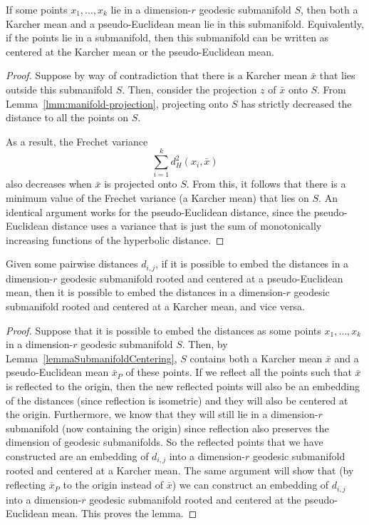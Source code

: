 \begin{lemma}
If some points $x_1, \ldots, x_k$ lie in a dimension-$r$ geodesic submanifold $S$, then both a Karcher mean and a pseudo-Euclidean mean lie in this submanifold.
Equivalently, if the points lie in a submanifold, then this submanifold can be written as centered at the Karcher mean or the pseudo-Euclidean mean. 
\label{lemmaSubmanifoldCentering}
\end{lemma}
\begin{proof}
Suppose by way of contradiction that there is a Karcher mean $\bar x$ that lies outside this submanifold $S$.
Then, consider the projection $z$ of $\bar x$ onto $S$.
From Lemma~\ref{lmm:manifold-projection}, projecting onto $S$ has strictly decreased the distance to all the points on $S$.

As a result, the Frechet variance
\[
  \sum_{i=1}^k d_H^2(x_i, \bar x)
\]
also decreases when $\bar x$ is projected onto $S$.
From this, it follows that there is a minimum value of the Frechet variance (a Karcher mean) that lies on $S$.
An identical argument works for the pseudo-Euclidean distance, since the pseudo-Euclidean distance uses a variance that is just the sum of monotonically increasing functions of the hyperbolic distance.
\end{proof}

\begin{lemma}
Given some pairwise distances $d_{i,j}$, if it is possible to embed the distances in a dimension-$r$ geodesic submanifold rooted and centered at a pseudo-Euclidean mean, then it is possible to embed the distances in a dimension-$r$ geodesic submanifold rooted and centered at a Karcher mean, and vice versa.
\end{lemma}
\begin{proof}
Suppose that it is possible to embed the distances as some points $x_1, \ldots, x_k$ in a dimension-$r$ geodesic submanifold $S$.
Then, by Lemma~\ref{lemmaSubmanifoldCentering}, $S$ contains both a Karcher mean $\bar x$ and a pseudo-Euclidean mean $\bar x_P$ of these points.
If we reflect all the points such that $\bar x$ is reflected to the origin, then the new reflected points will also be an embedding of the distances (since reflection is isometric) and they will also be centered at the origin.
Furthermore, we know that they will still lie in a dimension-$r$ submanifold (now containing the origin) since reflection also preserves the dimension of geodesic submanifolds.
So the reflected points that we have constructed are an embedding of $d_{i,j}$ into a dimension-$r$ geodesic submanifold rooted and centered at a Karcher mean.
The same argument will show that (by reflecting $\bar x_P$ to the origin instead of $\bar x$) we can construct an embedding of $d_{i,j}$ into a dimension-$r$ geodesic submanifold rooted and centered at the pseudo-Euclidean mean.
This proves the lemma.
\end{proof}

